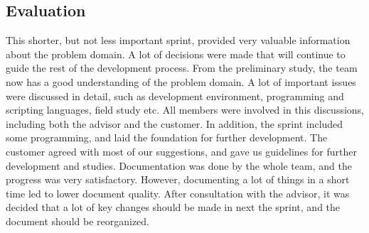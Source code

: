 \subsection{Evaluation}
	This shorter, but not less important sprint, provided very valuable information about the problem domain. A lot of decisions were made that will continue to guide the rest of the development process. From the preliminary study, the team now has a good understanding of the problem domain. A lot of important issues were discussed in detail, such as development environment, programming and scripting languages, field study etc. All members were involved in this discussions, including both the advisor and the customer. In addition, the sprint included some programming, and laid the foundation for further development. 
	The customer agreed with most of our suggestions, and gave us guidelines for further development and studies.
Documentation was done by the whole team, and the progress was very satisfactory. However, documenting a lot of things in a short time led to lower document quality. After consultation with the advisor, it was decided that a lot of key changes should be made in next the sprint, and the document should be reorganized.
